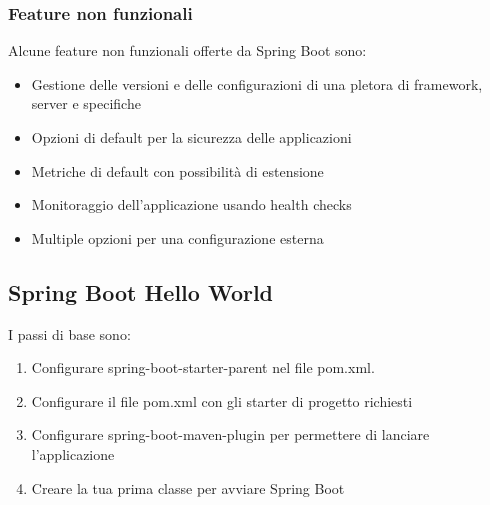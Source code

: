 \documentclass[11pt,a4paper]{book}
\begin{document}
\subsubsection{Feature non funzionali}
Alcune feature non funzionali offerte da Spring Boot sono:
\begin{itemize}
	\item Gestione delle versioni e delle configurazioni di una pletora di framework, server e specifiche
	\item Opzioni di default per la sicurezza delle applicazioni
	\item Metriche di default con possibilità di estensione
	\item Monitoraggio dell'applicazione usando health checks
	\item Multiple opzioni per una configurazione esterna
\end{itemize}

\subsection{Spring Boot Hello World}
I passi di base sono:
\begin{enumerate}
	\item Configurare spring-boot-starter-parent nel file pom.xml.
	\item Configurare il file pom.xml con gli starter di progetto richiesti
	\item Configurare spring-boot-maven-plugin per permettere di lanciare l'applicazione
	\item Creare la tua prima classe per avviare Spring Boot
\end{enumerate}
\end{document}
